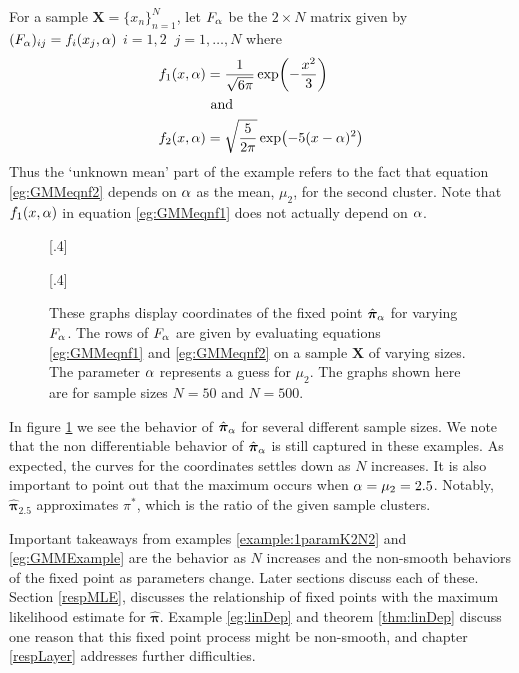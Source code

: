 \begin{eg}\label{eg:GMMExample}
		For a sample \( \bm X = \{x_n\}_{n=1}^N \), let \( F_\alpha \) be the \( 2\times N \) matrix given by \( (F_\alpha)_{ij} = f_i(x_j,\alpha) \)  \( i=1,2\;\;j=1,\ldots,N \) where
		\begin{align}
		f_1(x,\alpha) &= \dfrac{1}{\sqrt{6\pi}} \exp(-\frac{x^2}{3}) \label{eg:GMMeqnf1}\\ 
			   &\text{ and}\nonumber \\ 
		f_2(x,\alpha)&= \sqrt{\dfrac{5}{2\pi}} \exp(-5(x-\alpha)^2 )	   \label{eg:GMMeqnf2}
		\end{align}
		Thus the `unknown mean' part of the example refers to the fact that equation \ref{eg:GMMeqnf2} depends on \( \alpha \) as the mean, \( \mu_2 \), for the second cluster. Note that \( f_1(x,\alpha) \) in equation \ref{eg:GMMeqnf1} does not actually depend on \( \alpha \).
		
		\begin{figure}
			\centering
			[.4\linewidth]{
				
			}
			[.4\linewidth]{
				
			}
			\caption[Fixed Point Estimates of GMM Mixing Probabilities]{These graphs display coordinates of the fixed point \( \hat{\bm \pi}_\alpha \) for varying \( F_\alpha \). The rows of \( F_\alpha \) are given by evaluating equations \ref{eg:GMMeqnf1} and \ref{eg:GMMeqnf2} on a sample \( \bm X \) of varying sizes.  The parameter \( \alpha \) represents a guess for \( \mu_2 \).  The graphs shown here are for sample sizes \( N = 50 \) and \( N=500 \).} \label{fig:gmmExampleK2}
		\end{figure}
	
		In figure \ref{fig:gmmExampleK2} we see the behavior of \( \hat{\bm \pi}_\alpha \) for several different sample sizes. We note that the non differentiable behavior of \( \hat{\bm \pi}_\alpha \) is still captured in these examples. As expected, the curves for the coordinates settles down as \( N \) increases. It is also important to point out that the maximum occurs when \( \alpha =\mu_2 =2.5 \). Notably, \( \hat{\bm \pi}_{2.5} \) approximates \( \pi^{\ast} \), which is the ratio of the given sample clusters.
		
\end{eg}

Important takeaways from examples \ref{example:1paramK2N2} and \ref{eg:GMMExample} are the behavior as \( N \) increases and the non-smooth behaviors of the fixed point as parameters change. Later sections discuss each of these.  Section \ref{respMLE}, discusses the relationship of fixed points with the maximum likelihood estimate for \( \hat{\bm \pi} \). Example \ref{eg:linDep} and theorem \ref{thm:linDep} discuss one reason that this fixed point process might be non-smooth, and chapter \ref{respLayer} addresses further difficulties.